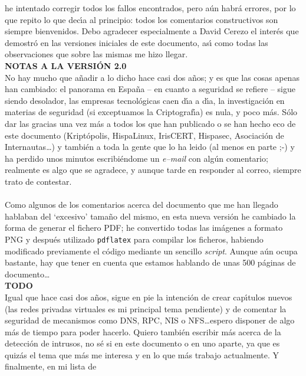 he intentado corregir todos los fallos encontrados, pero a\'un habr\'a errores, 
por lo que repito lo que dec\'{\i}a al principio: todos los comentarios 
constructivos son siempre bienvenidos. Debo agradecer especialmente a David 
Cerezo el inter\'es que demostr\'o en las versiones iniciales de este 
documento, as\'{\i} como todas las observaciones que sobre las mismas me hizo 
llegar.
\vspace{1cm}\\
{\bf NOTAS A LA VERSI\'ON 2.0}\\
No hay mucho que a\~nadir a lo dicho hace casi dos a\~nos; y es que las cosas
apenas han cambiado: el panorama en Espa\~na -- en cuanto a seguridad se 
refiere -- sigue siendo desolador, las empresas tecnol\'ogicas caen d\'{\i}a a
d\'{\i}a, la investigaci\'on en materias de seguridad (si exceptuamos la 
Criptograf\'{\i}a) es nula, y poco m\'as. S\'olo dar las gracias una vez m\'as 
a todos los que 
han publicado o se han hecho eco de este documento (Kript\'opolis, HispaLinux,
IrisCERT, Hispasec, Asociaci\'on de Internautas\ldots) y tambi\'en a toda la 
gente que lo ha leido (al menos en parte ;-) y ha perdido unos minutos 
escribi\'endome un {\it e--mail} con alg\'un comentario; realmente es algo que
se agradece, y aunque tarde en responder al correo, siempre trato de 
contestar.\\
\\Como algunos de los comentarios acerca del documento que me han llegado
hablaban del `excesivo' tama\~no del mismo, en esta nueva versi\'on he cambiado
la forma de generar el fichero PDF; he convertido todas las im\'agenes a
formato PNG y despu\'es utilizado {\tt pdflatex} para compilar los ficheros,
habiendo modificado previamente el c\'odigo mediante un sencillo {\it script}. 
Aunque a\'un ocupa bastante, hay que tener en cuenta que estamos hablando de
unas 500 p\'aginas de documento\ldots
\vspace{1cm}\\
{\bf TODO}\\
Igual que hace casi dos a\~nos, sigue en pie la intenci\'on de crear 
cap\'{\i}tulos nuevos (las redes privadas virtuales es mi principal tema 
pendiente) y de comentar la seguridad de mecanismos como DNS, RPC, NIS o 
NFS\ldots espero disponer de algo m\'as de tiempo para poder hacerlo. Quiero 
tambi\'en escribir m\'as acerca de la detecci\'on de intrusos, no s\'e si en 
este documento o en uno aparte, ya que es quiz\'as el tema que m\'as me 
interesa y en lo que m\'as trabajo actualmente. Y finalmente, en mi lista de
